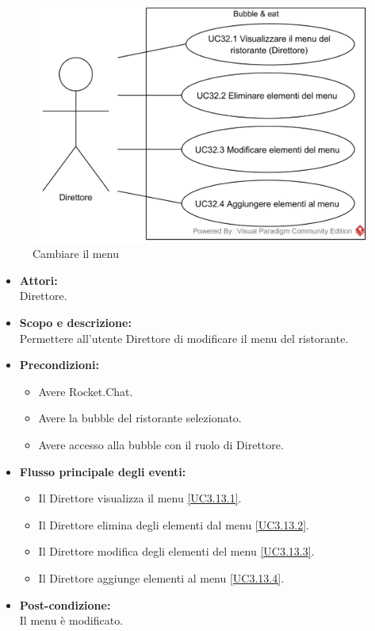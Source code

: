 
\begin{figure}[H]
	\centering
	\includegraphics[width=15cm]{../../documenti/AnalisiDeiRequisiti/Diagrammi_img/usecase/uc3_13.png}
	\caption{\UCCaption{} Cambiare il menu}
\end{figure}


\begin{itemize}
	\item \textbf{Attori:}
	\\Direttore.
	\item \textbf{Scopo e descrizione:} 
	\\Permettere all'utente Direttore di modificare il menu del ristorante.
	\item \textbf{Precondizioni:}
	\begin{itemize}
		\item Avere Rocket.Chat.
		\item Avere la bubble del ristorante selezionato.
		\item Avere accesso alla bubble con il ruolo di Direttore.
	\end{itemize}
	\item \textbf{Flusso principale degli eventi:}
	\begin{itemize}
		\item Il Direttore visualizza il menu \ref{UC3.13.1}.
		\item Il Direttore elimina degli elementi dal menu \ref{UC3.13.2}.
		\item Il Direttore modifica degli elementi del menu \ref{UC3.13.3}.
		\item Il Direttore aggiunge elementi al menu \ref{UC3.13.4}.
	\end{itemize}
	\item \textbf{Post-condizione:}
	\\Il menu è modificato.
\end{itemize}

